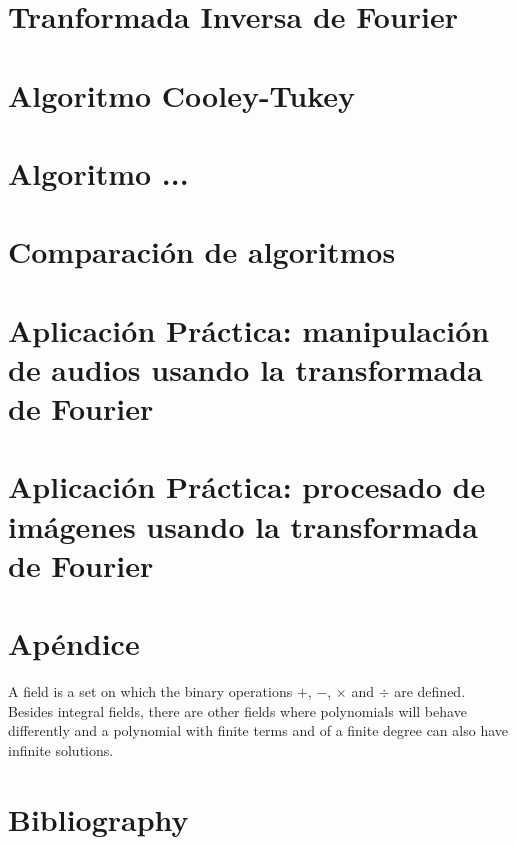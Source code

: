 \documentclass[preprint,review,12pt]{elsarticle}
\begin{document}
\section{Tranformada Inversa de Fourier}
\section{Algoritmo Cooley-Tukey}
\section{Algoritmo ...}
\section{Comparación de algoritmos}
\section{Aplicación Práctica: manipulación de audios usando la transformada de Fourier}
\section{Aplicación Práctica: procesado de imágenes usando la transformada de Fourier}

\section*{Apéndice}
A field is a set on which the binary operations $+$, $-$, $\times$ and $\div$ are defined.
Besides integral fields, there are other fields where polynomials will behave differently and a polynomial with finite terms and of a finite degree can also have infinite solutions.





\appendix
\section*{Bibliography}

\end{document}
